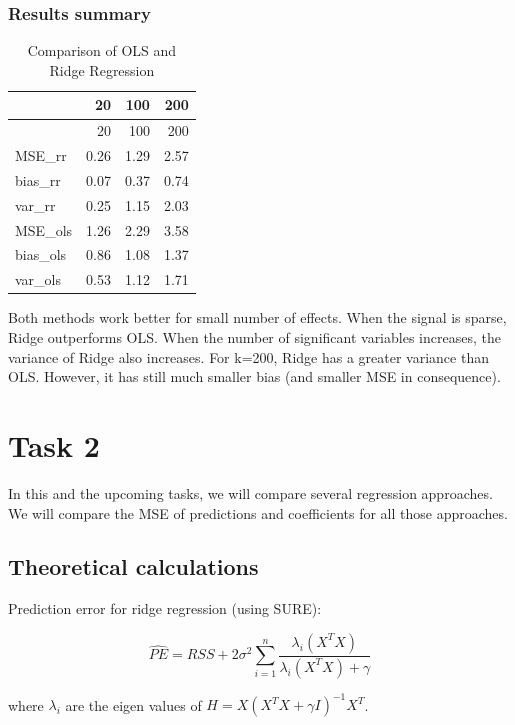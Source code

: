 \documentclass[
]{article}
\begin{document}
\hypertarget{results-summary}{%
\subsubsection{Results summary}\label{results-summary}}

\begin{longtable}[]{@{}lrrr@{}}
\caption{Comparison of OLS and Ridge Regression}\tabularnewline
\toprule
& 20 & 100 & 200 \\
\midrule
\endfirsthead
\toprule
& 20 & 100 & 200 \\
\midrule
\endhead
MSE\_rr & 0.26 & 1.29 & 2.57 \\
bias\_rr & 0.07 & 0.37 & 0.74 \\
var\_rr & 0.25 & 1.15 & 2.03 \\
MSE\_ols & 1.26 & 2.29 & 3.58 \\
bias\_ols & 0.86 & 1.08 & 1.37 \\
var\_ols & 0.53 & 1.12 & 1.71 \\
\bottomrule
\end{longtable}

Both methods work better for small number of effects. When the signal is
sparse, Ridge outperforms OLS. When the number of significant variables
increases, the variance of Ridge also increases. For k=200, Ridge has a
greater variance than OLS. However, it has still much smaller bias (and
smaller MSE in consequence).

\hypertarget{task-2}{%
\section{Task 2}\label{task-2}}

In this and the upcoming tasks, we will compare several regression
approaches. We will compare the MSE of predictions and coefficients for
all those approaches.

\hypertarget{theoretical-calculations}{%
\subsection{Theoretical calculations}\label{theoretical-calculations}}

Prediction error for ridge regression (using SURE):

\[\widehat{PE} = RSS + 2\sigma^2\sum_{i=1}^n \frac{\lambda_i (X^TX)}{\lambda_i (X^TX) + \gamma}\]

where \(\lambda_i\) are the eigen values of
\(H=X(X^TX+\gamma I)^{-1}X^T\).
\end{document}
